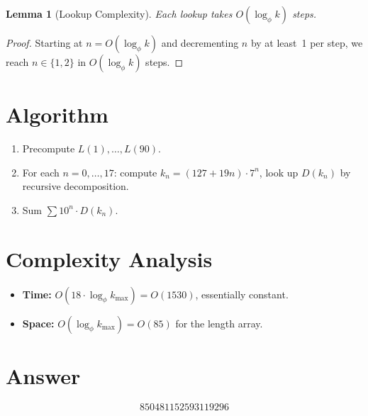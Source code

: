 \documentclass[12pt]{article}
\newtheorem{lemma}[theorem]{Lemma}
\begin{document}
\begin{lemma}[Lookup Complexity]
Each lookup takes $O(\log_\phi k)$ steps.
\end{lemma}
\begin{proof}
Starting at $n = O(\log_\phi k)$ and decrementing $n$ by at least~1 per step, we reach $n \in \{1,2\}$ in $O(\log_\phi k)$ steps.
\end{proof}

\section{Algorithm}
\begin{enumerate}
\item Precompute $L(1), \ldots, L(90)$.
\item For each $n = 0, \ldots, 17$: compute $k_n = (127 + 19n) \cdot 7^n$, look up $D(k_n)$ by recursive decomposition.
\item Sum $\sum 10^n \cdot D(k_n)$.
\end{enumerate}

\section{Complexity Analysis}
\begin{itemize}
\item \textbf{Time:} $O(18 \cdot \log_\phi k_{\max}) = O(1530)$, essentially constant.
\item \textbf{Space:} $O(\log_\phi k_{\max}) = O(85)$ for the length array.
\end{itemize}

\section{Answer}

\[
\boxed{850481152593119296}
\]
\end{document}
